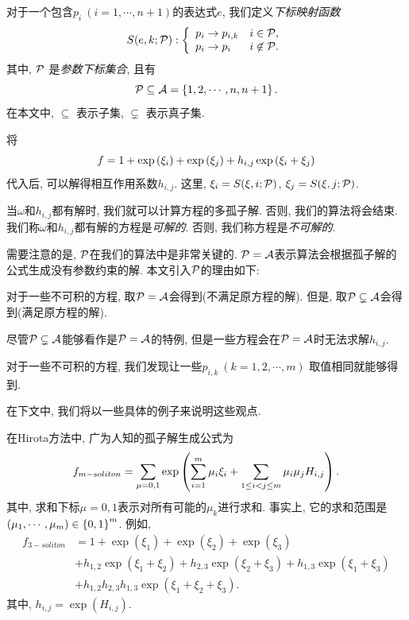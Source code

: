 对于一个包含$p_i~(i=1,\cdots,n+1)$的表达式$e$, 我们定义\emph{下标映射函数}
\begin{equation}
    S(e,k;\mathcal{P}): \left\{\begin{array}{ll}
        p_i \rightarrow p_{i,k} & i \in \mathcal{P}, \\ 
        p_i \rightarrow p_i & i \not\in \mathcal{P}.
    \end{array}\right.
\end{equation}
其中, $\mathcal{P}$ 是\emph{参数下标集合}, 且有 
\begin{equation}
    \mathcal{P}\subseteq  \mathcal{A}=\left\{1,2,\cdots,n,n+1\right\}.
\end{equation}
在本文中, $\subseteq$ 表示子集, $\subsetneq$ 表示真子集. 

将
\begin{equation}
    f=1+\exp\left(\xi_i\right)+\exp\left(\xi_j\right)+h_{i,j}\exp\left(\xi_i+\xi_j\right) \label{hij}
\end{equation}
代入后, 可以解得相互作用系数$h_{i,j}$. 这里, $\xi_i=S(\xi,i;\mathcal{P})$, $\xi_j=S(\xi,j;\mathcal{P})$.

当$\omega$和$h_{i,j}$都有解时, 我们就可以计算方程的多孤子解. 否则, 我们的算法将会结束. 我们称$\omega$和$h_{i,j}$都有解的方程是\emph{可解的}. 否则, 我们称方程是\emph{不可解的}.

需要注意的是, $\mathcal{P}$在我们的算法中是非常关键的. $\mathcal{P}= \mathcal{A}$表示算法会根据孤子解的公式生成没有参数约束的解. 本文引入$\mathcal{P}$的理由如下: 
\begin{compactenum}[1. ]
\item 对于一些不可积的方程, 取$\mathcal{P}= \mathcal{A}$会得到\emph{\FalseSol{}}(不满足原方程的解). 但是, 取$\mathcal{P}\subsetneq  \mathcal{A}$会得到\emph{\TrueSol{}}(满足原方程的解).
\item 尽管$\mathcal{P}\subsetneq  \mathcal{A}$能够看作是$\mathcal{P}= \mathcal{A}$的特例, 但是一些方程会在$\mathcal{P}= \mathcal{A}$时无法求解$h_{i,j}$.
\item 对于一些不可积的方程, 我们发现让一些$p_{i,k}~(k=1,2,\cdots,m)$ 取值相同就能够得到\TrueSol{}.
\end{compactenum}
在下文中, 我们将以一些具体的例子来说明这些观点. 

在Hirota方法中, 广为人知的孤子解生成公式为\cite{hirota1973exact}
\begin{equation}
    f_{m-soliton}=\sum_{\mu=0,1}\exp\left(\sum_{i=1}^m{\mu_i \xi_i}+\sum_{1\le i<j\le m}{\mu_i\mu_jH_{i,j}}\right). \label{f-soliton-old}
\end{equation}
其中, 求和下标$\mu=0,1$表示对所有可能的$\mu_k$进行求和. 事实上, 它的求和范围是$\left(\mu_1,\cdots,\mu_m\right)\in \left\{0,1\right\}^m$. 例如, 
\begin{equation}
\begin{split}
f_{3-soliton}&=1+\exp(\xi_1)+\exp(\xi_2)+\exp(\xi_3)\\
&+h_{1,2}\exp(\xi_1+\xi_2)+h_{2,3}\exp(\xi_2+\xi_3)+h_{1,3}\exp(\xi_1+\xi_3)\\
&+h_{1,2}h_{2,3}h_{1,3}\exp(\xi_1+\xi_2+\xi_3).
\end{split}
\end{equation}
其中, $h_{i,j}=\exp(H_{i,j})$.

